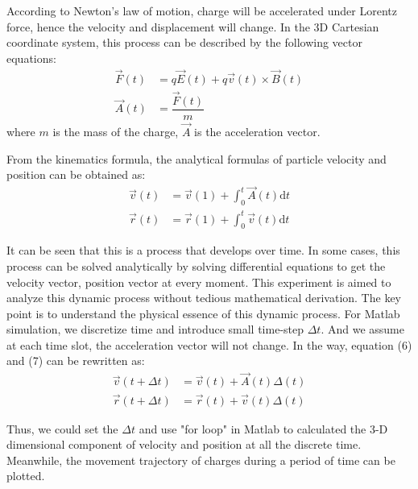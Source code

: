 \documentclass[journal,twocolumn,letterpaper]{IEEEJERM}
\begin{document}
According to Newton's law of motion, charge will be accelerated under Lorentz force, hence the  velocity and displacement will change. In the 3D Cartesian coordinate system, this process can be described by the following vector equations:
\begin{align}
\vec{F}(t)&=q\vec{E}(t)+q\vec{v}(t)\times \vec{B}(t)\\
\vec{A}(t)&=\dfrac{\vec{F}(t)}{m}
\end{align}
where $ m $ is the mass of the charge, $ \vec{A} $ is the acceleration vector.

From the kinematics formula, the analytical formulas of particle velocity and position can be obtained as:
\begin{align}
\vec{v}(t)&=\vec{v}(1)+\int_0^t \vec{A}(t)\mathrm{d}t \\
\vec{r}(t)&=\vec{r}(1)+\int_0^t\vec{v}(t)\mathrm{d}t
\end{align}

It can be seen that this is a process that develops over time. In some cases, this process can be solved analytically by solving differential equations to get the velocity vector, position vector at every moment. This experiment is aimed to analyze this dynamic process without tedious mathematical derivation. The key point is to understand the physical essence of this dynamic process. 
For Matlab simulation, we discretize time and introduce small time-step $ \Delta{t} $. And we assume at each time slot, the acceleration vector will not change. In the way, equation (6) and (7) can be rewritten as:
\begin{align}
\vec{v}(t+\Delta{t})&=\vec{v}(t)+\vec{A}(t)\Delta(t) \\
\vec{r}(t+\Delta{t})&=\vec{r}(t)+\vec{v}(t)\Delta(t)
\end{align}

Thus, we could set the $ \Delta{t} $ and use "for loop" in Matlab to calculated the 3-D dimensional component of velocity and position at all the discrete time.  Meanwhile, the movement trajectory of charges during a period of time can be plotted. 
\end{document}
